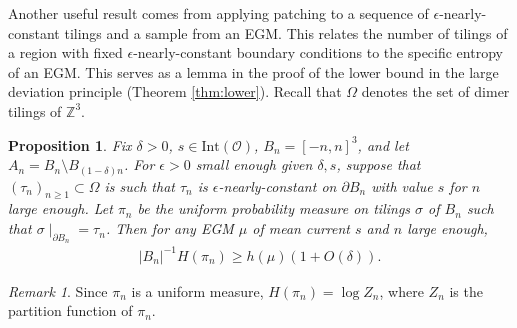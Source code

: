 \documentclass[11pt]{article}
\newtheorem{prop}[thm]{Proposition}
\theoremstyle{remark}
\newtheorem{rem}[thm]{Remark}
\theoremstyle{definition}
\newcommand{\mc}[1]{\mathcal{#1}}
\newcommand{\m}[1]{\mathbb{#1}}
\begin{document}
Another useful result comes from applying patching to a sequence of $\epsilon$-nearly-constant tilings and a sample from an EGM. This relates the number of tilings of a region with fixed $\epsilon$-nearly-constant boundary conditions to the specific entropy of an EGM. This serves as a lemma in the proof of the lower bound in the large deviation principle (Theorem \ref{thm:lower}). Recall that $\Omega$ denotes the set of dimer tilings of $\m Z^3$.

\begin{prop}\label{thm:epsilon_nearly_constant_vs_EGM}
Fix $\delta>0$, $s\in \text{Int}(\mc O)$,  $B_n = [-n,n]^3$, and let $A_n = B_n\setminus B_{(1-\delta)n}$. For $\epsilon>0$ small enough given $\delta,s$, suppose that $(\tau_n)_{n\geq 1}\subset \Omega$ is such that $\tau_n$ is $\epsilon$-nearly-constant on $\partial B_n$ with value $s$ for $n$ large enough. Let $\pi_n$ be the uniform probability measure on tilings $\sigma$ of $B_n$ such that $\sigma\mid_{\partial B_n} = \tau_n$. Then for any EGM $\mu$ of mean current $s$ and $n$ large enough, 
\begin{align*}
    |B_n|^{-1} H(\pi_n) \geq h(\mu) (1+ O(\delta)). 
\end{align*}
\end{prop}
\begin{rem}
Since $\pi_n$ is a uniform measure, $H(\pi_n) = \log Z_n$, where $Z_n$ is the partition function of $\pi_n$. 
\end{rem}
\end{document}

